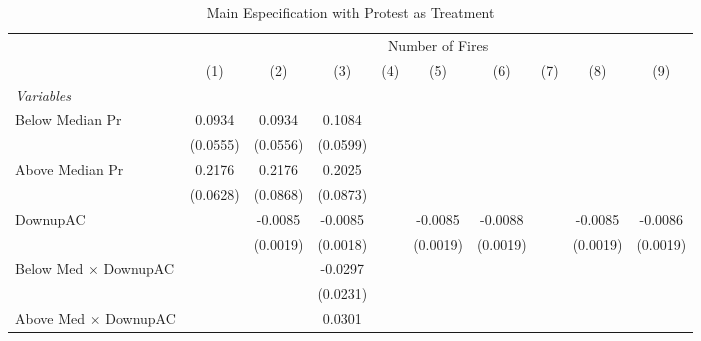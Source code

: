 
\begin{table}[htbp]
   \caption{\label{tab:protest_treat_main} Main Especification with Protest as Treatment}
   \centering
   \begin{tabular}{lccccccccc}
      \tabularnewline \midrule \midrule
       & \multicolumn{9}{c}{Number of Fires}\\
                                      & (1)           & (2)           & (3)           & (4)           & (5)           & (6)           & (7)           & (8)           & (9)\\  
      \midrule
      \emph{Variables}\\
      Below Median Pr                 & 0.0934        & 0.0934        & 0.1084        &               &               &               &               &               &   \\   
                                      & (0.0555)      & (0.0556)      & (0.0599)      &               &               &               &               &               &   \\   
      Above Median Pr                 & 0.2176        & 0.2176        & 0.2025        &               &               &               &               &               &   \\   
                                      & (0.0628)      & (0.0868)      & (0.0873)      &               &               &               &               &               &   \\   
      DownupAC                        &               & -0.0085       & -0.0085       &               & -0.0085       & -0.0088       &               & -0.0085       & -0.0086\\   
                                      &               & (0.0019)      & (0.0018)      &               & (0.0019)      & (0.0019)      &               & (0.0019)      & (0.0019)\\   
      Below Med $\times$ DownupAC     &               &               & -0.0297       &               &               &               &               &               &   \\   
                                      &               &               & (0.0231)      &               &               &               &               &               &   \\   
      Above Med $\times$ DownupAC     &               &               & 0.0301        &               &               &               &               &               &   \\   

\end{tabular}
\end{table}
